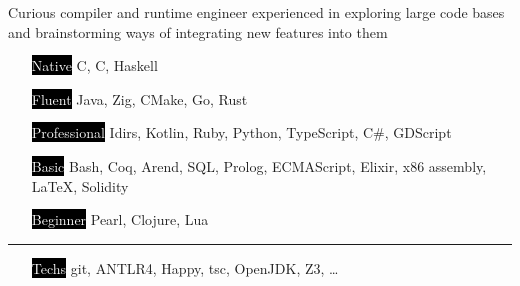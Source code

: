 \documentclass[9pt]{template/developercv}
\def\Cpp{{C\raisebox{0.05em}{\texttt{++}}}}
\begin{document}
\begin{minipage}[t]{0.35\textwidth}

	Curious compiler and runtime engineer experienced in exploring large code bases and brainstorming ways of integrating new features into them\\
	\bio
\end{minipage}
\hfill
\begin{minipage}[t]{0.55\textwidth}
	\vspace{-0.5\baselineskip}

	\begin{itemize}
		\setlength{\itemsep}{0pt}
		\setlength{\parskip}{0.0\baselineskip}
    \setlength{\parsep}{0pt}
		\item[\colorbox{black}{\textcolor{white}{Native}}] C, \Cpp, Haskell
		\item[\colorbox{black}{\textcolor{white}{Fluent}}] Java, Zig, CMake, Go, Rust
		\item[\colorbox{black}{\textcolor{white}{Professional}}] Idirs, Kotlin, Ruby, Python, TypeScript, C\#, GDScript
		\item[\colorbox{black}{\textcolor{white}{Basic}}] Bash, Coq, Arend, SQL, Prolog, ECMAScript, Elixir, x86 assembly, \LaTeX, Solidity
		\item[\colorbox{black}{\textcolor{white}{Beginner}}] Pearl, Clojure, Lua
	\end{itemize}
	\vspace{-0.5\baselineskip}
	\noindent\hspace{-0.1\textwidth}\rule{1.1\textwidth}{0.4pt}
	\begin{itemize}
		\setlength{\itemsep}{0pt}
		\setlength{\parskip}{0.0\baselineskip}
	\setlength{\parsep}{0pt}
		\item[\colorbox{black}{\textcolor{white}{Techs}}] git, ANTLR4, Happy, tsc, OpenJDK, Z3, \dots
	\end{itemize}
\end{minipage}


\end{document}
